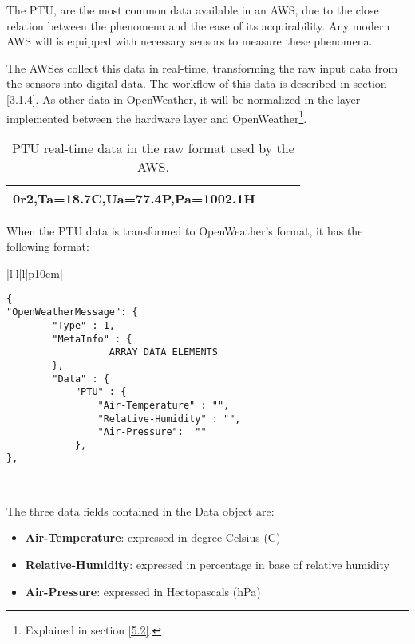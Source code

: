 The \gls{PTU}, are the most common data available in an \gls{AWS}, due to the close relation between the phenomena and the ease of its acquirability. Any modern \gls{AWS} will is equipped with necessary sensors to measure these phenomena.

The \gls{AWS}es collect this data in real-time, transforming the raw input data from the sensors into digital data. The workflow of this data is described in section \ref{3.1.4}. As other data in OpenWeather, it will be normalized in the layer implemented between the hardware layer and OpenWeather\footnote{Explained in section \ref{5.2}.}.

\begin{table}[hc]
\centering
\begin{tabular}{ | l | l | l | l |}
\hline    
0r2,Ta=18.7C,Ua=77.4P,Pa=1002.1H\\
\hline
\end{tabular}
\caption{\protect \gls{PTU} real-time data in the raw format used by the \protect \gls{AWS}.}
\end{table}

When the \gls{PTU} data is transformed to OpenWeather's format, it has the following format:

\begin{table}[H]
\centering
\begin{tabular}{|l|l|l|p{10cm}|}
\hline
\begin{minipage}[t]{\linewidth}
	\begin{verbatim}
{
"OpenWeatherMessage": {
        "Type" : 1,
        "MetaInfo" : {
	              ARRAY DATA ELEMENTS
        },
        "Data" : {
            "PTU" : {
                "Air-Temperature" : "", 
                "Relative-Humidity" : "", 
                "Air-Pressure":  ""
            },
},
      \end{verbatim}
\end{minipage} \\
\hline
\end{tabular}
\caption{PTU data field in a data message of OpenWeather protocol.}
\end{table}

The three data fields contained in the Data object are:

\begin{itemize}
\item \textbf{Air-Temperature}: expressed in degree Celsius (\textdegree C)
\item \textbf{Relative-Humidity}: expressed in percentage in base of relative humidity
\item \textbf{Air-Pressure}: expressed in Hectopascals (hPa)
\end{itemize}

